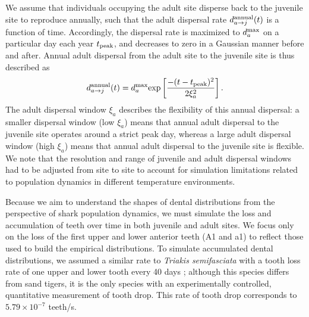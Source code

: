 \documentclass[]{rsos}%
\begin{document}



We assume that individuals occupying the adult site disperse back to the juvenile site to reproduce annually, such that the adult dispersal rate $d_{a\rightarrow j}^{\rm annual}(t)$ is a function of time.
Accordingly, the dispersal rate is maximized to $d_a^{\rm max}$ on a particular day each year $t_{\rm peak}$, and decreases to zero in a Gaussian manner before and after.
Annual adult dispersal from the adult site to the juvenile site is thus described as
\begin{equation}
    d_{a\rightarrow j}^{\rm annual}(t) = d_a^{\rm max}{\rm exp}\left[\frac{-(t - t_{\rm peak})^2}{2\xi_a^2}\right].
\end{equation}
The adult dispersal window $\xi_a$ describes the flexibility of this annual dispersal: a smaller dispersal window (low $\xi_a$) means that annual adult dispersal to the juvenile site operates around a strict peak day, whereas a large adult dispersal window (high $\xi_a$) means that annual adult dispersal to the juvenile site is flexible.
We note that the resolution and range of juvenile and adult dispersal windows had to be adjusted from site to site to account for simulation limitations related to population dynamics in different temperature environments.


Because we aim to understand the shapes of dental distributions from the perspective of shark population dynamics, we must simulate the loss and accumulation of teeth over time in both juvenile and adult sites.
We focus only on the loss of the first upper and lower anterior teeth (A1 and a1) to reflect those used to build the empirical distributions.
To simulate accumulated dental distributions, we assumed a similar rate to \emph{Triakis semifasciata} with a tooth loss rate of one upper and lower tooth every 40 days \cite{zeichner2017discrimination}; although this species differs from sand tigers, it is the only species with an experimentally controlled, quantitative measurement of tooth drop. This rate of tooth drop corresponds to $5.79\times 10^{-7}$ teeth/s.
\end{document}

